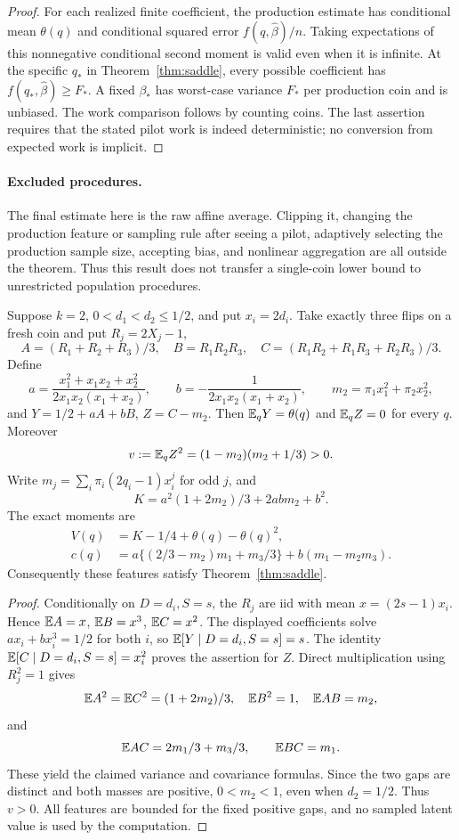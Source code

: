 \begin{proof}
For each realized finite coefficient, the production estimate has conditional
mean $\theta(q)$ and conditional squared error $f(q,\widehat\beta)/n$.
Taking expectations of this nonnegative conditional second moment is valid
even when it is infinite. At the specific $q_*$ in
Theorem~\ref{thm:saddle}, every possible coefficient has
$f(q_*,\widehat\beta)\ge F_*$. A fixed $\beta_*$ has worst-case variance
$F_*$ per production coin and is unbiased. The work comparison follows by
counting coins. The last assertion requires that the stated pilot work is
indeed deterministic; no conversion from expected work is implicit.
\end{proof}

\paragraph{Excluded procedures.}
The final estimate here is the raw affine average. Clipping it, changing the
production feature or sampling rule after seeing a pilot, adaptively selecting
the production sample size, accepting bias, and nonlinear aggregation are all
outside the theorem. Thus this result does not transfer a single-coin lower
bound to unrestricted population procedures.

\begin{proposition}\label{prop:two}
Suppose $k=2$, $0<d_1<d_2\le1/2$, and put $x_i=2d_i$. Take exactly three
flips on a fresh coin and put $R_j=2X_j-1$,
\[
 A=(R_1+R_2+R_3)/3,\quad B=R_1R_2R_3,\quad
 C=(R_1R_2+R_1R_3+R_2R_3)/3.
\]
Define
\[
 a=\frac{x_1^2+x_1x_2+x_2^2}{2x_1x_2(x_1+x_2)},\qquad
 b=-\frac1{2x_1x_2(x_1+x_2)},\qquad
 m_2=\pi_1x_1^2+\pi_2x_2^2,
\]
and $Y=1/2+aA+bB$, $Z=C-m_2$. Then $\mathbb E_qY=\theta(q)$ and
$\mathbb E_qZ=0$ for every $q$. Moreover
\[
 v:=\mathbb E_q Z^2=(1-m_2)(m_2+1/3)>0.
\]
Write $m_j=\sum_i\pi_i(2q_i-1)x_i^j$ for odd $j$, and
\[
 K=a^2(1+2m_2)/3+2abm_2+b^2.
\]
The exact moments are
\begin{align*}
 V(q)&=K-1/4+\theta(q)-\theta(q)^2,\\
 c(q)&=a\{(2/3-m_2)m_1+m_3/3\}+b(m_1-m_2m_3).
\end{align*}
Consequently these features satisfy Theorem~\ref{thm:saddle}.
\end{proposition}

\begin{proof}
Conditionally on $D=d_i,S=s$, the $R_j$ are iid with mean
$x=(2s-1)x_i$. Hence $\mathbb E A=x$, $\mathbb E B=x^3$, $\mathbb E C=x^2$.
The displayed coefficients solve $ax_i+bx_i^3=1/2$ for both $i$, so
$\mathbb E[Y\mid D=d_i,S=s]=s$.
The identity $\mathbb E[C\mid D=d_i,S=s]=x_i^2$ proves the assertion for $Z$.
Direct multiplication using $R_j^2=1$ gives
\[
 \mathbb E A^2=\mathbb E C^2=(1+2m_2)/3,\quad \mathbb E B^2=1,\quad
 \mathbb E AB=m_2,
\]
and
\[
 \mathbb E AC=2m_1/3+m_3/3,\qquad \mathbb E BC=m_1.
\]
These yield the claimed variance and covariance formulas. Since the two
gaps are distinct and both masses are positive, $0<m_2<1$, even when
$d_2=1/2$. Thus $v>0$. All features are bounded for the fixed positive gaps,
and no sampled latent value is used by the computation.
\end{proof}


